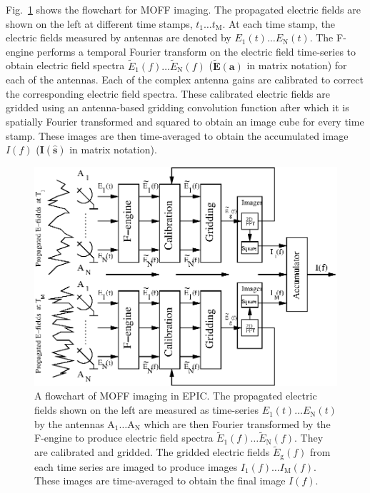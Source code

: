 \documentclass[a4paper,fleqn,usenatbib]{mnras}
\begin{document}
Fig.~\ref{fig:MOFF-flowchart} shows the flowchart for MOFF imaging. The
propagated electric fields are shown on the left at different time stamps,
$t_1\ldots t_\textrm{M}$. At each time stamp, the electric fields measured by
antennas are denoted by $E_1(t)\ldots E_\textrm{N}(t)$. The F-engine performs a
temporal Fourier transform on the electric field time-series to obtain electric
field spectra $\widetilde{E}_1(f)\ldots \widetilde{E}_\textrm{N}(f)$ 
($\widetilde{\mathbf{E}}(\mathbf{a})$ in matrix notation) for each of the 
antennas. Each of the complex antenna gains are calibrated to correct the 
corresponding electric field spectra. These calibrated electric fields are 
gridded using an antenna-based gridding convolution function after which it is 
spatially Fourier transformed and squared to obtain an image cube for every time 
stamp. These images are then time-averaged to obtain the accumulated image 
$I(f)$ ($\mathbf{I}(\hat{\mathbf{s}})$ in matrix notation).

\begin{figure}
  \includegraphics[width=\columnwidth]{figure1}
  \caption{A flowchart of MOFF imaging in EPIC. The propagated electric fields
    shown on the left are measured as time-series $E_1(t)\ldots E_\textrm{N}(t)$
    by the antennas $\textrm{A}_1\ldots \textrm{A}_\textrm{N}$ which are then 
    Fourier transformed by the F-engine to produce electric field spectra 
    $\widetilde{E}_1(f)\ldots \widetilde{E}_\textrm{N}(f)$. They are calibrated 
    and gridded. The gridded electric fields $\widetilde{E}_\textrm{g}(f)$ from 
    each time series are imaged to produce images 
    $I_1(f)\ldots I_\textrm{M}(f)$. These images are time-averaged to obtain the 
    final image $I(f)$.}
  \label{fig:MOFF-flowchart}
\end{figure}
\end{document}
